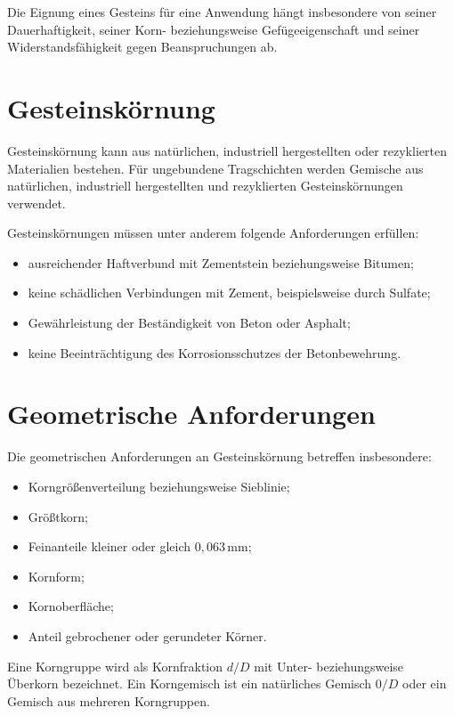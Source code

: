 \documentclass[
  12pt,
  a4paper,
  oneside
]{scrreprt}
\begin{document}
Die Eignung eines Gesteins für eine Anwendung hängt insbesondere von
seiner Dauerhaftigkeit, seiner Korn- beziehungsweise Gefügeeigenschaft
und seiner Widerstandsfähigkeit gegen Beanspruchungen ab.


\section{Gesteinskörnung}

Gesteinskörnung kann aus natürlichen, industriell hergestellten oder
rezyklierten Materialien bestehen. Für ungebundene Tragschichten werden
Gemische aus natürlichen, industriell hergestellten und rezyklierten
Gesteinskörnungen verwendet. 

Gesteinskörnungen müssen unter anderem folgende Anforderungen erfüllen:

\begin{itemize}
  \item ausreichender Haftverbund mit Zementstein beziehungsweise
  Bitumen;
  \item keine schädlichen Verbindungen mit Zement, beispielsweise
  durch Sulfate;
  \item Gewährleistung der Beständigkeit von Beton oder Asphalt;
  \item keine Beeinträchtigung des Korrosionsschutzes der
  Betonbewehrung.
\end{itemize}



\section{Geometrische Anforderungen}

Die geometrischen Anforderungen an Gesteinskörnung betreffen
insbesondere:

\begin{itemize}
  \item Korngrößenverteilung beziehungsweise Sieblinie;
  \item Größtkorn;
  \item Feinanteile kleiner oder gleich $0{,}063\,\mathrm{mm}$;
  \item Kornform;
  \item Kornoberfläche;
  \item Anteil gebrochener oder gerundeter Körner.
\end{itemize}



Eine Korngruppe wird als Kornfraktion $d/D$ mit Unter- beziehungsweise
Überkorn bezeichnet. Ein Korngemisch ist ein natürliches Gemisch
$0/D$ oder ein Gemisch aus mehreren Korngruppen.
\end{document}
